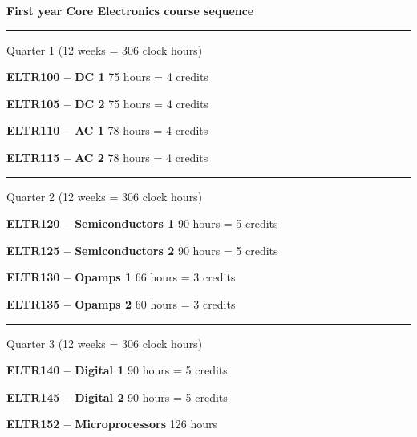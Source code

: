 

\centerline{\bf First year Core Electronics course sequence} \bigskip 

\vskip 5pt
\hrule
\vskip 5pt

\noindent
Quarter 1 (12 weeks = 306 clock hours)

\vskip 10pt

{\bf ELTR100 -- DC 1} \hskip 10pt 75 hours = 4 credits 
 
\vskip 10pt

{\bf ELTR105 -- DC 2} \hskip 10pt 75 hours = 4 credits 
 
\vskip 10pt

{\bf ELTR110 -- AC 1} \hskip 10pt 78 hours = 4 credits 
 
\vskip 10pt

{\bf ELTR115 -- AC 2} \hskip 10pt 78 hours = 4 credits 
 
\vskip 10pt


\vskip 5pt
\hrule
\vskip 5pt

\noindent
Quarter 2 (12 weeks = 306 clock hours)

\vskip 10pt

{\bf ELTR120 -- Semiconductors 1} \hskip 10pt 90 hours = 5 credits 
 
\vskip 10pt

{\bf ELTR125 -- Semiconductors 2} \hskip 10pt 90 hours = 5 credits 
 
\vskip 10pt

{\bf ELTR130 -- Opamps 1} \hskip 10pt 66 hours = 3 credits 
 
\vskip 10pt

{\bf ELTR135 -- Opamps 2} \hskip 10pt 60 hours = 3 credits 
 
\vskip 10pt


\vskip 5pt
\hrule
\vskip 5pt

\noindent
Quarter 3 (12 weeks = 306 clock hours)

\vskip 10pt

{\bf ELTR140 -- Digital 1} \hskip 10pt 90 hours = 5 credits 
 
\vskip 10pt

{\bf ELTR145 -- Digital 2} \hskip 10pt 90 hours = 5 credits 
 
\vskip 10pt

{\bf ELTR152 -- Microprocessors} \hskip 10pt 126 hours
 

